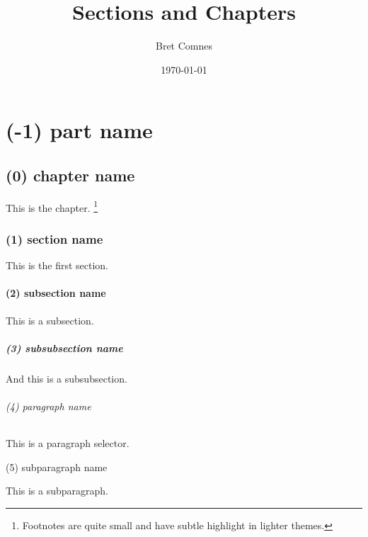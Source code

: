 \documentclass{report}
\title{Sections and Chapters}
\author{Bret Comnes}
\date{\today}
\begin{document}
\maketitle
\part{(-1) part name} %
\label{prt:part_name}

\chapter{(0) chapter name} %
\label{cha:chapter_name}
This is the chapter.
\footnote{Footnotes are quite small and have subtle highlight in lighter themes.}

\section{(1) section name} %
\label{sec:section_name}
This is the first section.

\subsection{(2) subsection name} %
\label{sub:subsection_name}
This is a subsection.

\subsubsection{(3) subsubsection name} %
\label{ssub:subsubsection_name}
And this is a subsubsection.

\paragraph{(4) paragraph name} %
\label{par:paragraph_name}
This is a paragraph selector.

\subparagraph{(5) subparagraph name} %
\label{subp:subparagraph_name}
This is a subparagraph.
\end{document}
